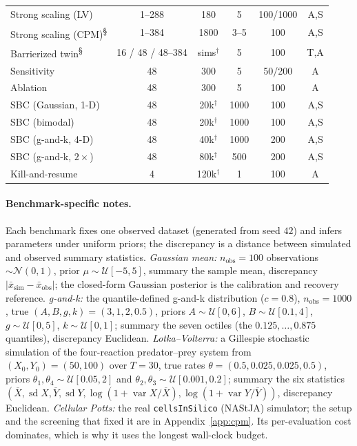 \documentclass[10pt]{article}
\theoremstyle{plain}
\theoremstyle{definition}
\begin{document}
\begin{table}[t]
\begin{tabular}{@{}lccccc@{}}
Strong scaling (LV)    & 1--288 & 180  & 5 & 100/1000 & A,S \\
Strong scaling (CPM)\textsuperscript{\S} & 1--384 & 1800 & 3--5 & 100 & A,S \\
Barrierized twin\textsuperscript{\S}  & 16 / 48 / 48--384 & sims$^\dagger$ & 5 & 100 & T,A \\
Sensitivity            & 48 & 300  & 5   & 50/200 & A \\
Ablation               & 48 & 300  & 5   & 100 & A \\
SBC (Gaussian, 1-D)    & 48 & 20k$^\dagger$  & 1000 & 100 & A,S \\
SBC (bimodal)          & 48 & 20k$^\dagger$  & 1000 & 100 & A,S \\
SBC (g-and-k, 4-D)     & 48 & 40k$^\dagger$  & 1000 & 200 & A,S \\
SBC (g-and-k, $2\times$) & 48 & 80k$^\dagger$ & 500 & 200 & A,S \\
Kill-and-resume        & 4  & 120k$^\dagger$ & 1    & 100 & A \\
\bottomrule
\end{tabular}
\end{table}

\paragraph{Benchmark-specific notes.} Each benchmark fixes one observed dataset (generated from seed $42$) and infers parameters under uniform priors; the discrepancy is a distance between simulated and observed summary statistics. \emph{Gaussian mean:} $n_{\text{obs}}=100$ observations $\sim\mathcal{N}(0,1)$, prior $\mu\sim\mathcal{U}[-5,5]$, summary the sample mean, discrepancy $|\bar x_{\text{sim}}-\bar x_{\text{obs}}|$; the closed-form Gaussian posterior is the calibration and recovery reference. \emph{g-and-k:} the quantile-defined g-and-k distribution ($c=0.8$), $n_{\text{obs}}=1000$, true $(A,B,g,k)=(3,1,2,0.5)$, priors $A\sim\mathcal{U}[0,6]$, $B\sim\mathcal{U}[0.1,4]$, $g\sim\mathcal{U}[0,5]$, $k\sim\mathcal{U}[0,1]$; summary the seven octiles (the $0.125,\dots,0.875$ quantiles), discrepancy Euclidean. \emph{Lotka--Volterra:} a Gillespie stochastic simulation \citep{gillespie1977} of the four-reaction predator--prey system from $(X_0,Y_0)=(50,100)$ over $T=30$, true rates $\theta=(0.5,0.025,0.025,0.5)$, priors $\theta_1,\theta_4\sim\mathcal{U}[0.05,2]$ and $\theta_2,\theta_3\sim\mathcal{U}[0.001,0.2]$; summary the six statistics $(\overline X,\operatorname{sd}X,\overline Y,\operatorname{sd}Y,\log(1{+}\operatorname{var}X/\overline X),\log(1{+}\operatorname{var}Y/\overline Y))$, discrepancy Euclidean. \emph{Cellular Potts:} the real \texttt{cellsInSilico} (NAStJA) simulator; the setup and the screening that fixed it are in Appendix~\ref{app:cpm}. Its per-evaluation cost dominates, which is why it uses the longest wall-clock budget.
\end{document}
